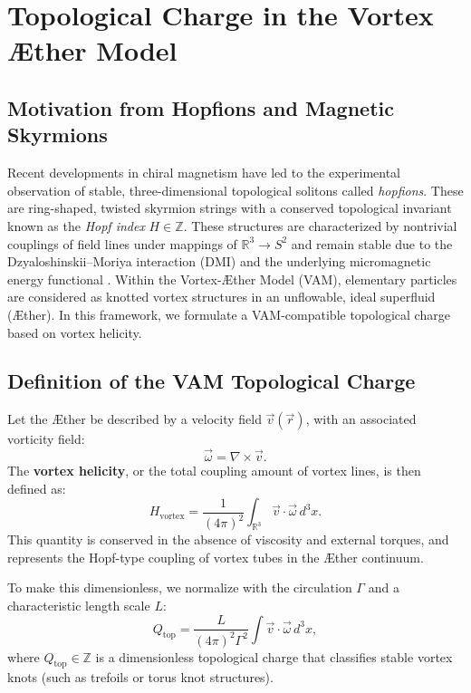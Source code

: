 \section{Topological Charge in the Vortex Æther Model}\label{sec:appendix:9}

\subsection{Motivation from Hopfions and Magnetic Skyrmions}

Recent developments in chiral magnetism have led to the experimental observation of stable, three-dimensional topological solitons called \emph{hopfions}. These are ring-shaped, twisted skyrmion strings with a conserved topological invariant known as the \emph{Hopf index} $H \in \mathbb{Z}$. These structures are characterized by nontrivial couplings of field lines under mappings of $\mathbb{R}^3 \to S^2$ and remain stable due to the Dzyaloshinskii–Moriya interaction (DMI) and the underlying micromagnetic energy functional \cite{Zheng2023Hopfions}. Within the Vortex-Æther Model (VAM), elementary particles are considered as knotted vortex structures in an unflowable, ideal superfluid (Æther). In this framework, we formulate a VAM-compatible topological charge based on vortex helicity.

\subsection{Definition of the VAM Topological Charge}

Let the Æther be described by a velocity field $\vec{v}(\vec{r})$, with an associated vorticity field:
\begin{equation}
    \vec{\omega} = \nabla \times \vec{v}.
\end{equation}
The \textbf{vortex helicity}, or the total coupling amount of vortex lines, is then defined as:
\begin{equation}
    H_\text{vortex} = \frac{1}{(4\pi)^2} \int_{\mathbb{R}^3} \vec{v} \cdot \vec{\omega} \, d^3x.
    \label{eq:helicity}
\end{equation}
This quantity is conserved in the absence of viscosity and external torques, and represents the Hopf-type coupling of vortex tubes in the Æther continuum.

To make this dimensionless, we normalize with the circulation $\Gamma$ and a characteristic length scale $L$:
\begin{equation}
    Q_\text{top} = \frac{L}{(4\pi)^2 \Gamma^2} \int \vec{v} \cdot \vec{\omega} \, d^3x,
    \label{eq:qtop}
\end{equation}
where $Q_\text{top} \in \mathbb{Z}$ is a dimensionless topological charge that classifies stable vortex knots (such as trefoils or torus knot structures).

